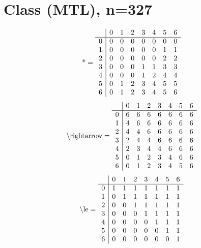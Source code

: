\documentclass[11pt]{article}
\begin{document}
\section{Class (MTL), n=327}
\[\text{*} = 
\begin{array}{r | r r r r r r r}
 & 0 & 1 & 2 & 3 & 4 & 5 & 6 \\ \hline
0 & 0 & 0 & 0 & 0 & 0 & 0 & 0 \\
1 & 0 & 0 & 0 & 0 & 0 & 1 & 1 \\
2 & 0 & 0 & 0 & 0 & 0 & 2 & 2 \\
3 & 0 & 0 & 0 & 1 & 1 & 3 & 3 \\
4 & 0 & 0 & 0 & 1 & 2 & 4 & 4 \\
5 & 0 & 1 & 2 & 3 & 4 & 5 & 5 \\
6 & 0 & 1 & 2 & 3 & 4 & 5 & 6 \\
\end{array}
\]
\[\text{\textbackslash rightarrow} = 
\begin{array}{r | r r r r r r r}
 & 0 & 1 & 2 & 3 & 4 & 5 & 6 \\ \hline
0 & 6 & 6 & 6 & 6 & 6 & 6 & 6 \\
1 & 4 & 6 & 6 & 6 & 6 & 6 & 6 \\
2 & 4 & 4 & 6 & 6 & 6 & 6 & 6 \\
3 & 2 & 4 & 4 & 6 & 6 & 6 & 6 \\
4 & 2 & 3 & 4 & 4 & 6 & 6 & 6 \\
5 & 0 & 1 & 2 & 3 & 4 & 6 & 6 \\
6 & 0 & 1 & 2 & 3 & 4 & 5 & 6 \\
\end{array}
\]
\[\text{\textbackslash le} = 
\begin{array}{r | r r r r r r r}
 & 0 & 1 & 2 & 3 & 4 & 5 & 6 \\ \hline
0 & 1 & 1 & 1 & 1 & 1 & 1 & 1 \\
1 & 0 & 1 & 1 & 1 & 1 & 1 & 1 \\
2 & 0 & 0 & 1 & 1 & 1 & 1 & 1 \\
3 & 0 & 0 & 0 & 1 & 1 & 1 & 1 \\
4 & 0 & 0 & 0 & 0 & 1 & 1 & 1 \\
5 & 0 & 0 & 0 & 0 & 0 & 1 & 1 \\
6 & 0 & 0 & 0 & 0 & 0 & 0 & 1 \\
\end{array}
\]
\end{document}
